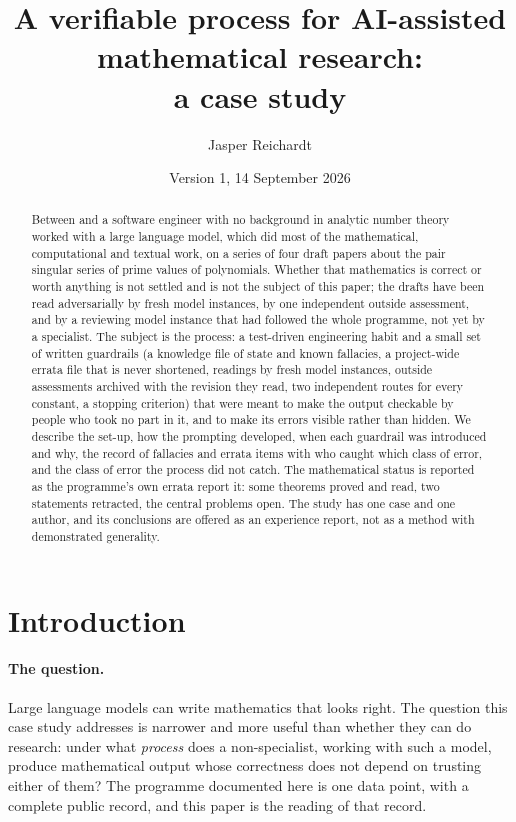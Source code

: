 \documentclass[11pt,a4paper]{article}
\title{A verifiable process for AI-assisted mathematical research:\\ a case study}
\author{Jasper Reichardt}
\date{Version 1, 14 September 2026}
\begin{document}
\maketitle

\begin{abstract}
\noindent
Between \FirstDay{} and \LastDay{} a software engineer with no background in analytic number theory worked with a
large language model, which did most of the mathematical, computational and textual work, on a series of four
draft papers about the pair singular series of prime values of polynomials. Whether that mathematics is correct or
worth anything is not settled and is not the subject of this paper; the drafts have been read adversarially by
fresh model instances, by one independent outside assessment, and by a reviewing model instance that had followed the
whole programme, not yet by a specialist. The subject is the process: a test-driven
engineering habit and a small set of written guardrails (a knowledge file of state and known fallacies, a
project-wide errata file that is never shortened, readings by fresh model instances, outside assessments archived
with the revision they read, two independent routes for every constant, a stopping criterion) that were meant to
make the output checkable by people who took no part in it, and to make its errors visible rather than hidden. We
describe the set-up, how the prompting developed, when each guardrail was introduced and why, the record of
\NFallacies{} fallacies and \NErrata{} errata items with who caught which class of error, and the class of error the process
did not catch. The mathematical status is reported as the programme's own errata report it: some theorems proved
and read, two statements retracted, the central problems open. The study has one case and one author, and its
conclusions are offered as an experience report, not as a method with demonstrated generality.
\end{abstract}

\tableofcontents

\section{Introduction}\label{sec:intro}

\paragraph{The question.} Large language models can write mathematics that looks right. The question this case
study addresses is narrower and more useful than whether they can do research: under what \emph{process} does a
non-specialist, working with such a model, produce mathematical output whose correctness does not depend on
trusting either of them? The programme documented here is one data point, with a complete public record, and
this paper is the reading of that record.
\end{document}

